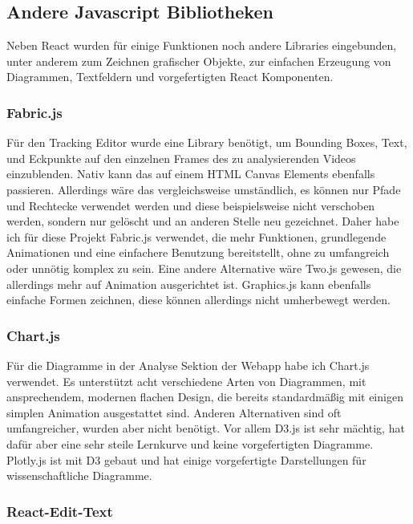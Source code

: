 \subsection{Andere Javascript Bibliotheken}

Neben React wurden für einige Funktionen noch andere Libraries eingebunden, unter anderem zum Zeichnen grafischer Objekte, zur einfachen Erzeugung von Diagrammen, Textfeldern und vorgefertigten React Komponenten.

\subsubsection{Fabric.js}\label{chapter:fabric}

Für den Tracking Editor wurde eine Library benötigt, um Bounding Boxes, Text, und Eckpunkte auf den einzelnen Frames des zu analysierenden Videos einzublenden. Nativ kann das auf einem HTML Canvas Elements ebenfalls passieren. Allerdings wäre das vergleichsweise umständlich, es können nur Pfade und Rechtecke verwendet werden und diese beispielsweise nicht verschoben werden, sondern nur gelöscht und an anderen Stelle neu gezeichnet. Daher habe ich für diese Projekt Fabric.js verwendet, die mehr Funktionen, grundlegende Animationen und eine einfachere Benutzung bereitstellt, ohne zu umfangreich oder unnötig komplex zu sein. Eine andere Alternative wäre Two.js gewesen, die allerdings mehr auf Animation ausgerichtet ist. Graphics.js kann ebenfalls einfache Formen zeichnen, diese können allerdings nicht umherbewegt werden.

\subsubsection{Chart.js}

Für die Diagramme in der Analyse Sektion der Webapp habe ich Chart.js verwendet. Es unterstützt acht verschiedene Arten von Diagrammen, mit ansprechendem, modernen flachen Design, die bereits standardmäßig mit einigen simplen Animation ausgestattet sind. Anderen Alternativen sind oft umfangreicher, wurden aber nicht benötigt. Vor allem D3.js ist sehr mächtig, hat dafür aber eine sehr steile Lernkurve und keine vorgefertigten Diagramme. Plotly.js ist mit D3 gebaut und hat einige vorgefertigte Darstellungen für wissenschaftliche Diagramme.

\subsubsection{React-Edit-Text}

